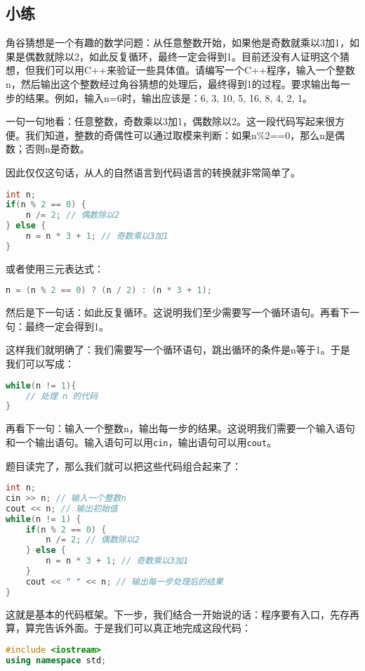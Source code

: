 \documentclass[../main.tex]{subfiles}
\begin{document}
\subsection{小练}

\begin{example}
  角谷猜想是一个有趣的数学问题：从任意整数开始，如果他是奇数就乘以3加1，如果是偶数就除以2，如此反复循环，最终一定会得到1。目前还没有人证明这个猜想，但我们可以用C++来验证一些具体值。请编写一个C++程序，输入一个整数n，然后输出这个整数经过角谷猜想的处理后，最终得到1的过程。要求输出每一步的结果。例如，输入n=6时，输出应该是：6, 3, 10, 5, 16, 8, 4, 2, 1。
\end{example}

\begin{answer}
  一句一句地看：任意整数，奇数乘以3加1，偶数除以2。这一段代码写起来很方便。我们知道，整数的奇偶性可以通过取模来判断：如果n\%2==0，那么n是偶数；否则n是奇数。

  因此仅仅这句话，从人的自然语言到代码语言的转换就非常简单了。
\begin{lstlisting}[language=C++]
int n;
if(n % 2 == 0) {
    n /= 2; // 偶数除以2
} else {
    n = n * 3 + 1; // 奇数乘以3加1
}
\end{lstlisting}

  或者使用三元表达式：
\begin{lstlisting}[language=C++]
n = (n % 2 == 0) ? (n / 2) : (n * 3 + 1);
\end{lstlisting}

  然后是下一句话：如此反复循环。这说明我们至少需要写一个循环语句。再看下一句：最终一定会得到1。

  这样我们就明确了：我们需要写一个循环语句，跳出循环的条件是n等于1。于是我们可以写成：
\begin{lstlisting}[language=C++]
while(n != 1){
    // 处理 n 的代码
}
\end{lstlisting}

  再看下一句：输入一个整数n，输出每一步的结果。这说明我们需要一个输入语句和一个输出语句。输入语句可以用\texttt{cin}，输出语句可以用\texttt{cout}。

  题目读完了，那么我们就可以把这些代码组合起来了：
\begin{lstlisting}[language=C++]
int n;
cin >> n; // 输入一个整数n
cout << n; // 输出初始值
while(n != 1) {
    if(n % 2 == 0) {
        n /= 2; // 偶数除以2
    } else {
        n = n * 3 + 1; // 奇数乘以3加1
    }
    cout << " " << n; // 输出每一步处理后的结果
}
\end{lstlisting}
  这就是基本的代码框架。下一步，我们结合一开始说的话：程序要有入口，先存再算，算完告诉外面。于是我们可以真正地完成这段代码：
\begin{lstlisting}[language=C++]
#include <iostream>
using namespace std;


\end{lstlisting}
\end{answer}
\end{document}
